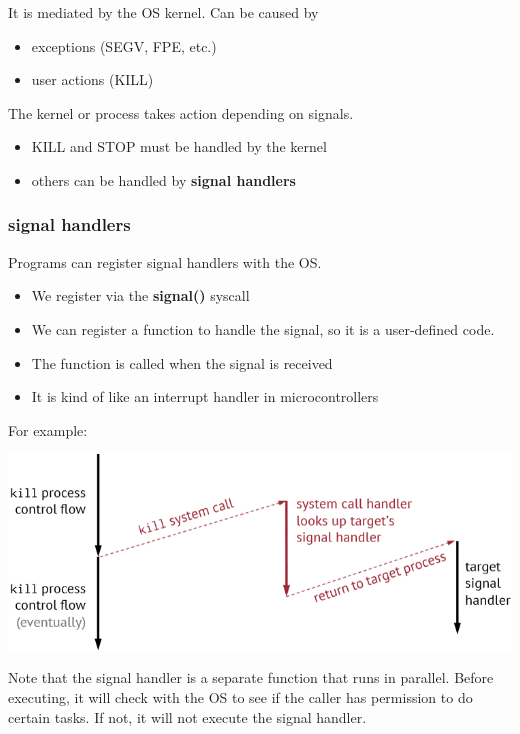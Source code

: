 \documentclass[letterpaper,12pt]{article}
\begin{document}
It is mediated by the OS kernel. Can be caused by \begin{itemize}
    \item exceptions (SEGV, FPE, etc.)
    \item user actions (KILL)
\end{itemize}

The kernel or process takes action depending on signals. \begin{itemize}
    \item KILL and STOP must be handled by the kernel
    \item others can be handled by \textbf{signal handlers}
\end{itemize}
\subsubsection{signal handlers}
Programs can register signal handlers with the OS. \begin{itemize}
    \item We register via the \textbf{signal()} syscall
    \item We can register a function to handle the signal, so it is a user-defined code.
    \item The function is called when the signal is received
    \item It is kind of like an interrupt handler in microcontrollers
\end{itemize}
For example:

\includegraphics*[scale=0.8]{./Images/Signal handelr.png}

Note that the signal handler is a separate function that runs in parallel.
Before executing, it will check with the OS to see if the caller has permission
to do certain tasks. If not, it will not execute the signal handler.
\end{document}
